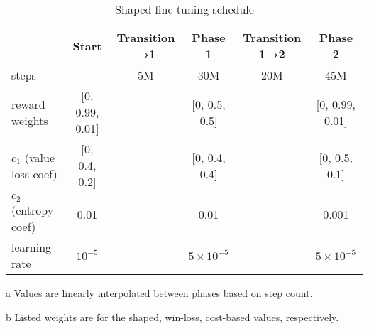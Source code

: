 \documentclass[conference,onecolumn]{IEEEtran}
\newcounter{supptable}
\newenvironment{supptable}
  {\renewcommand{\tablename}{Supplemental Table}\setcounter{table}{\value{supptable}}\addtocounter{supptable}{1}\begin{table}}
  {\end{table}\setcounter{supptable}{\value{table}}}
\begin{document}
\begin{supptable}[H]
\end{supptable}

\begin{supptable}[H]
    \centering
    \begin{threeparttable}
    \caption{Shaped fine-tuning schedule}
    \label{tab:shaped-finetuning-schedule}
    \begin{tabular}{lccccc}
    \toprule
     & Start & Transition →1\tnote{a} & Phase 1 & Transition 1→2\tnote{a} & Phase 2 \\
     \midrule
    steps & & 5M & 30M & 20M & 45M \\
    reward weights\tnote{b} & [0, 0.99, 0.01] & & [0, 0.5, 0.5] & & [0, 0.99, 0.01] \\
    $c_1$ (value loss coef)\tnote{b} & [0, 0.4, 0.2] & & [0, 0.4, 0.4] & & [0, 0.5, 0.1]\\
    $c_2$ (entropy coef) & 0.01 & & 0.01 & & 0.001 \\
    learning rate & $10^{-5}$ & & $5 \times 10^{-5}$ & & $5 \times 10^{-5}$\\
    \bottomrule
    \end{tabular}
    \begin{tablenotes}
       \item[a] Values are linearly interpolated between phases based on step count.
       \item[b] Listed weights are for the shaped, win-loss, cost-based values, respectively.
    \end{tablenotes}
    \end{threeparttable}
\end{supptable}
\end{document}

